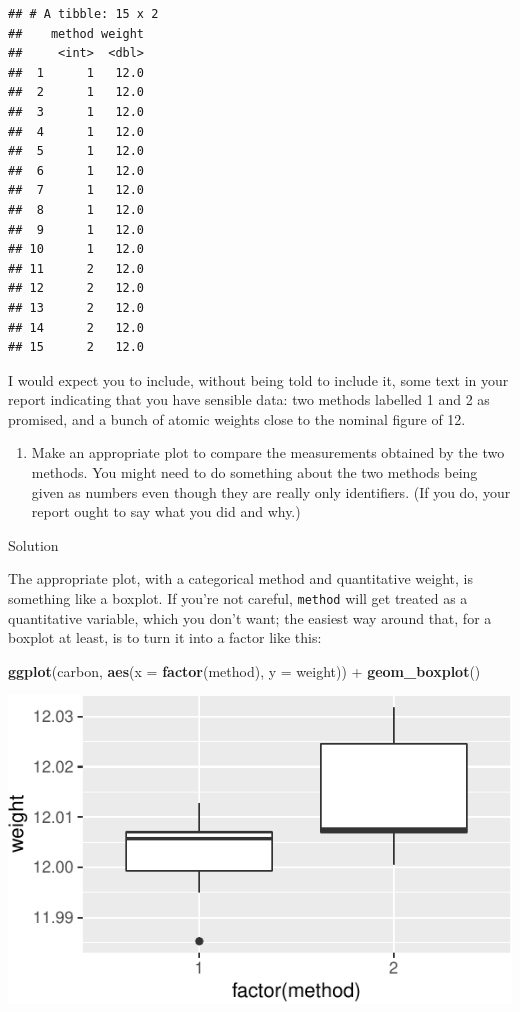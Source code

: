 \documentclass[]{tufte-book}
\newenvironment{Shaded}{}{}
\newcommand{\DataTypeTok}[1]{\textcolor[rgb]{0.56,0.13,0.00}{#1}}
\newcommand{\KeywordTok}[1]{\textcolor[rgb]{0.00,0.44,0.13}{\textbf{#1}}}
\newcommand{\NormalTok}[1]{#1}
\newcommand{\OperatorTok}[1]{\textcolor[rgb]{0.40,0.40,0.40}{#1}}
\newcommand{\StringTok}[1]{\textcolor[rgb]{0.25,0.44,0.63}{#1}}
\providecommand{\tightlist}{%
  \setlength{\itemsep}{0pt}\setlength{\parskip}{0pt}}
\theoremstyle{definition}
\theoremstyle{definition}
\theoremstyle{definition}
\theoremstyle{remark}
\begin{document}
\begin{verbatim}
## # A tibble: 15 x 2
##    method weight
##     <int>  <dbl>
##  1      1   12.0
##  2      1   12.0
##  3      1   12.0
##  4      1   12.0
##  5      1   12.0
##  6      1   12.0
##  7      1   12.0
##  8      1   12.0
##  9      1   12.0
## 10      1   12.0
## 11      2   12.0
## 12      2   12.0
## 13      2   12.0
## 14      2   12.0
## 15      2   12.0
\end{verbatim}

I would expect you to include, without being told to include it, some
text in your report indicating that you have sensible data: two methods
labelled 1 and 2 as promised, and a bunch
of atomic weights close to the nominal figure of 12.

\begin{enumerate}
\def\labelenumi{(\alph{enumi})}
\setcounter{enumi}{3}
\tightlist
\item
  Make an appropriate plot to compare the measurements obtained by the
  two methods. You might need to do something about the two methods
  being given as numbers even though they are really only identifiers.
  (If you do, your report ought to say what you did and why.)
\end{enumerate}

Solution

The appropriate plot, with a categorical method and quantitative weight,
is something like a boxplot. If you're not careful, \texttt{method} will
get treated as a quantitative variable, which you don't want; the
easiest way around that, for a boxplot at least, is to turn it into a
factor like this:

\begin{Shaded}
\begin{Highlighting}[]
\KeywordTok{ggplot}\NormalTok{(carbon, }\KeywordTok{aes}\NormalTok{(}\DataTypeTok{x =} \KeywordTok{factor}\NormalTok{(method), }\DataTypeTok{y =}\NormalTok{ weight)) }\OperatorTok{+}\StringTok{ }
\StringTok{    }\KeywordTok{geom_boxplot}\NormalTok{()}
\end{Highlighting}
\end{Shaded}

\includegraphics{10-analysis-of-variance_files/figure-latex/unnamed-chunk-52-1}
\end{document}
